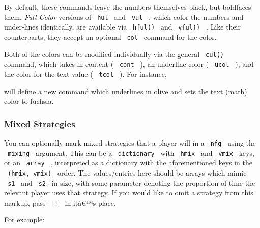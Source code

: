 By default, these commands leave the numbers themselves black, but
boldfaces them. \emph{Full Color} versions of \texttt{\ hul\ } and
\texttt{\ vul\ } , which color the numbers and under-lines identically,
are available via \texttt{\ hful()\ } and \texttt{\ vful()\ } . Like
their counterparts, they accept an optional \texttt{\ col\ } command for
the color.

Both of the colors can be modified individually via the general
\texttt{\ cul()\ } command, which takes in content ( \texttt{\ cont\ }
), an underline color ( \texttt{\ ucol\ } ), and the color for the text
value ( \texttt{\ tcol\ } ). For instance,

\begin{Shaded}
\begin{Highlighting}[]
\end{Highlighting}
\end{Shaded}

will define a new command which underlines in olive and sets the text
(math) color to fuchsia.

\subsubsection{Mixed Strategies}\label{mixed-strategies}

You can optionally mark mixed strategies that a player will in a
\texttt{\ nfg\ } using the \texttt{\ mixing\ } argument. This can be a
\texttt{\ dictionary\ } with \texttt{\ hmix\ } and \texttt{\ vmix\ }
keys, or an \texttt{\ array\ } , interpreted as a dictionary with the
aforementioned keys in the \texttt{\ (hmix,\ vmix)\ } order. The
values/entries here should be arrays which mimic \texttt{\ s1\ } and
\texttt{\ s2\ } in size, with some parameter denoting the proportion of
time the relevant player uses that strategy. If you would like to omit a
strategy from this markup, pass \texttt{\ {[}{]}\ } in itâ€™s place.

For example:

\begin{Shaded}
\begin{Highlighting}[]
\NormalTok{  [$7,3$], [$2,4$], }
\NormalTok{  [$5,2$], [$6,1$], }
\NormalTok{  [$6,1$], [$5,4$]}
\NormalTok{)}
\end{Highlighting}
\end{Shaded}

